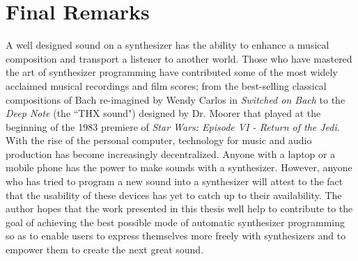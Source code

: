 \section{Final Remarks}
A well designed sound on a synthesizer has the ability to enhance a musical composition and transport a listener to another world. Those who have mastered the art of synthesizer programming have contributed some of the most widely acclaimed musical recordings and film scores; from the best-selling classical compositions of Bach re-imagined by Wendy Carlos in \textit{Switched on Bach} to the \textit{Deep Note} (the ``THX sound") designed by Dr. Moorer that played at the beginning of the 1983 premiere of \textit{Star Wars: Episode VI - Return of the Jedi}. With the rise of the personal computer, technology for music and audio production has become increasingly decentralized. Anyone with a laptop or a mobile phone has the power to make sounds with a synthesizer. However, anyone who has tried to program a new sound into a synthesizer will attest to the fact that the usability of these devices has yet to catch up to their availability. The author hopes that the work presented in this thesis well help to contribute to the goal of achieving the best possible mode of automatic synthesizer programming so as to enable users to express themselves more freely with synthesizers and to empower them to create the next great sound.

